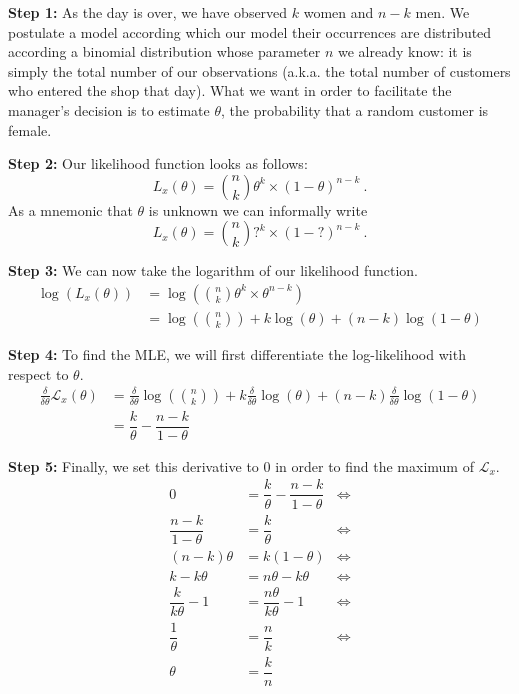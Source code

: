 \textbf{Step 1:} As the day is over, we have observed $ k $ women and $ n-k $ men. We postulate a model
according which our model their
occurrences are distributed according a binomial distribution whose parameter $ n $ we already know: it
is simply the total number of our observations (a.k.a. the total number of customers who entered the shop 
that day). What we want in order to facilitate the manager's decision is to estimate $ \theta $, the
probability that a random customer is female. 

\textbf{Step 2:} Our likelihood function looks as follows:
\begin{equation}
L_{x}(\theta) = \binom{n}{k} \theta^{k} \times (1 - \theta)^{n-k} \ .
\end{equation}
As a mnemonic that $ \theta $ is unknown we can informally write
$$ L_{x}(\theta) = \binom{n}{k} ?^{k} \times (1-?)^{n-k} \ . $$

\textbf{Step 3:} We can now take the logarithm of our likelihood function.
\begin{align}
\log(L_{x}(\theta)) &= \log\left(\binom{n}{k} \theta^{k} \times \theta^{n-k} \right) \\
&= \log \left(\binom{n}{k}\right) + k\log(\theta) + (n-k)\log(1-\theta)
\end{align}

\textbf{Step 4:} To find the MLE, we will first differentiate the log-likelihood with respect to $ \theta $.
\begin{align}
\frac{\delta}{\delta \theta} \mathcal{L}_{x}(\theta)
&= \frac{\delta}{\delta \theta} \log \left(\binom{n}{k}\right) + k \frac{\delta}{\delta \theta} \log(\theta) + (n-k) \frac{\delta}{\delta \theta} \log(1-\theta) \\
&= \dfrac{k}{\theta} - \dfrac{n-k}{1-\theta}
\end{align}

\textbf{Step 5:} Finally, we set this derivative to 0 in order to find the maximum of $ \mathcal{L}_{x} $.
\begin{align}
0 &= \dfrac{k}{\theta} - \dfrac{n-k}{1-\theta} &\Leftrightarrow \\
\dfrac{n-k}{1- \theta} &= \dfrac{k}{\theta} &\Leftrightarrow \\
(n-k) \theta &= k (1 - \theta) &\Leftrightarrow \\
k -k\theta &= n\theta - k\theta &\Leftrightarrow \\
\dfrac{k}{k\theta} - 1 &= \dfrac{n\theta}{k\theta} - 1 &\Leftrightarrow \\ 
\dfrac{1}{\theta} &= \dfrac{n}{k} &\Leftrightarrow \\
\theta &= \dfrac{k}{n}
\end{align}

